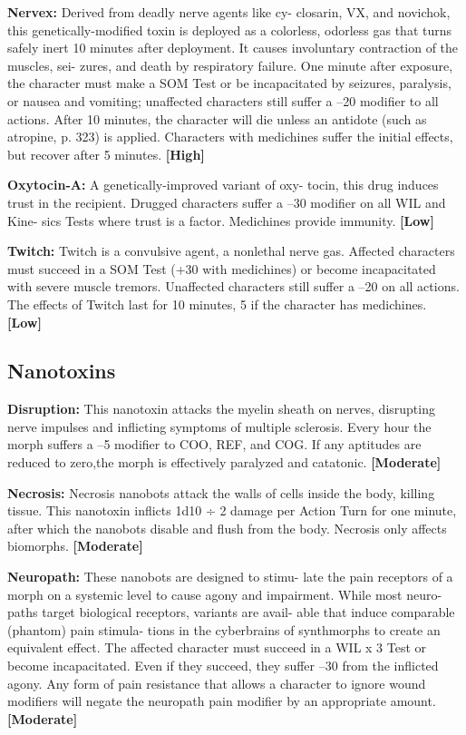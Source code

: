 \textbf{Nervex:} Derived from deadly nerve agents like cy-
closarin, VX, and novichok, this genetically-modified 
toxin is deployed as a colorless, odorless gas that 
turns safely inert 10 minutes after deployment. It 
causes involuntary contraction of the muscles, sei-
zures, and death by respiratory failure. One minute 
after exposure, the character must make a SOM Test 
or be incapacitated by seizures, paralysis, or nausea 
and vomiting; unaffected characters still suffer a –20 
modifier to all actions. After 10 minutes, the character 
will die unless an antidote (such as atropine, p. 323) is 
applied. Characters with medichines suffer the initial 
effects, but recover after 5 minutes. \textbf{[High]}

\textbf{Oxytocin-A:} A genetically-improved variant of oxy-
tocin, this drug induces trust in the recipient. Drugged 
characters suffer a –30 modifier on all WIL and Kine-
sics Tests where trust is a factor. Medichines provide 
immunity. \textbf{[Low]}

\textbf{Twitch:} Twitch is a convulsive agent, a nonlethal 
nerve gas. Affected characters must succeed in a SOM 
Test (+30 with medichines) or become incapacitated 
with severe muscle tremors. Unaffected characters still 
suffer a –20 on all actions. The effects of Twitch last for 
10 minutes, 5 if the character has medichines. \textbf{[Low]}

\subsection{Nanotoxins}

\textbf{Disruption:} This nanotoxin attacks the myelin sheath 
on nerves, disrupting nerve impulses and inflicting 
symptoms of multiple sclerosis. Every hour the morph 
suffers a –5 modifier to COO, REF, and COG. If any 
aptitudes are reduced to zero,the morph is effectively 
paralyzed and catatonic. \textbf{[Moderate]}

\textbf{Necrosis:} Necrosis nanobots attack the walls of cells 
inside the body, killing tissue. This nanotoxin inflicts 
1d10 ÷ 2 damage per Action Turn for one minute, after 
which the nanobots disable and flush from the body. 
Necrosis only affects biomorphs. \textbf{[Moderate]}

\textbf{Neuropath:} These nanobots are designed to stimu-
late the pain receptors of a morph on a systemic level 
to cause agony and impairment. While most neuro-
paths target biological receptors, variants are avail-
able that induce comparable (phantom) pain stimula-
tions in the cyberbrains of synthmorphs to create an 
equivalent effect. The affected character must succeed 
in a WIL x 3 Test or become incapacitated. Even if 
they succeed, they suffer –30 from the inflicted agony. 
Any form of pain resistance that allows a character 
to ignore wound modifiers will negate the neuropath 
pain modifier by an appropriate amount. \textbf{[Moderate]}

